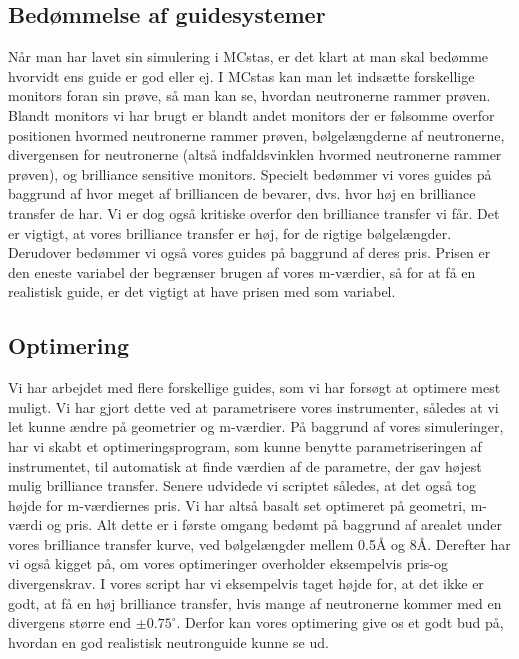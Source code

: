 \documentclass[12pt,oneside,a4paper]{article}
\begin{document}
{{{{{\subsection{Bedømmelse af guidesystemer}

Når man har lavet sin simulering i MCstas, er det klart at man skal bedømme hvorvidt ens guide er god eller ej. I MCstas kan man let indsætte forskellige monitors foran sin prøve, så man kan se, hvordan neutronerne rammer prøven. Blandt monitors vi har brugt er blandt andet monitors der er følsomme overfor positionen hvormed neutronerne rammer prøven, bølgelængderne af neutronerne, divergensen for neutronerne (altså indfaldsvinklen hvormed neutronerne rammer prøven), og brilliance sensitive monitors. Specielt bedømmer vi vores guides på baggrund af hvor meget af brilliancen de bevarer, dvs. hvor høj en brilliance transfer de har. Vi er dog også kritiske overfor den brilliance transfer vi får. Det er vigtigt, at vores brilliance transfer er høj, for de rigtige bølgelængder. Derudover bedømmer vi også vores guides på baggrund af deres pris. Prisen er den eneste variabel der begrænser brugen af vores m-værdier, så for at få en realistisk guide, er det vigtigt at have prisen med som variabel.


\subsection{Optimering}
Vi har arbejdet med flere forskellige guides, som vi har forsøgt at optimere mest muligt. Vi har gjort dette ved at parametrisere vores instrumenter, således at vi let kunne ændre på geometrier og m-værdier. På baggrund af vores simuleringer, har vi skabt et optimeringsprogram, som kunne benytte parametriseringen af instrumentet, til automatisk at finde værdien af de parametre, der gav højest mulig brilliance transfer. Senere udvidede vi scriptet således, at det også tog højde for m-værdiernes pris. Vi har altså basalt set optimeret på geometri, m-værdi og pris. Alt dette er i første omgang bedømt på baggrund af arealet under vores brilliance transfer kurve, ved bølgelængder mellem 0.5Å og 8Å. Derefter har vi også kigget på, om vores optimeringer overholder eksempelvis pris-og divergenskrav. I vores script har vi eksempelvis taget højde for, at det ikke er godt, at få en høj brilliance transfer, hvis mange af neutronerne kommer med en divergens større end $\pm0.75^\circ$. Derfor kan vores optimering give os et godt bud på, hvordan en god realistisk neutronguide kunne se ud. 


}}}}}
\end{document}
